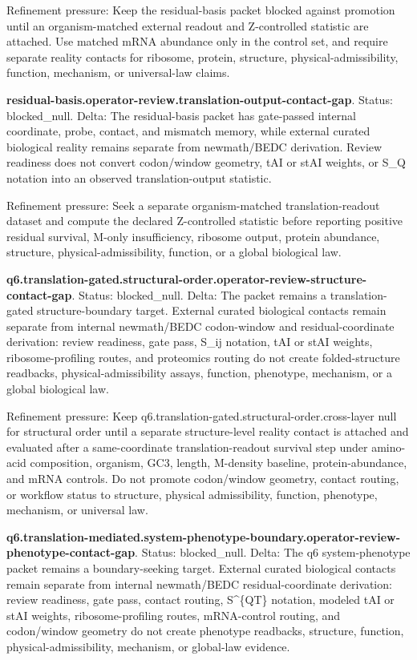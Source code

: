 Refinement pressure: Keep the residual-basis packet blocked against promotion until an organism-matched external readout and Z-controlled statistic are attached. Use matched mRNA abundance only in the control set, and require separate reality contacts for ribosome, protein, structure, physical-admissibility, function, mechanism, or universal-law claims.

\textbf{residual-basis.operator-review.translation-output-contact-gap}. Status: blocked\_null. Delta: The residual-basis packet has gate-passed internal coordinate, probe, contact, and mismatch memory, while external curated biological reality remains separate from newmath/BEDC derivation. Review readiness does not convert codon/window geometry, tAI or stAI weights, or S\_Q notation into an observed translation-output statistic.

Refinement pressure: Seek a separate organism-matched translation-readout dataset and compute the declared Z-controlled statistic before reporting positive residual survival, M-only insufficiency, ribosome output, protein abundance, structure, physical-admissibility, function, or a global biological law.

\textbf{q6.translation-gated.structural-order.operator-review-structure-contact-gap}. Status: blocked\_null. Delta: The packet remains a translation-gated structure-boundary target. External curated biological contacts remain separate from internal newmath/BEDC codon-window and residual-coordinate derivation: review readiness, gate pass, S\_ij notation, tAI or stAI weights, ribosome-profiling routes, and proteomics routing do not create folded-structure readbacks, physical-admissibility assays, function, phenotype, mechanism, or a global biological law.

Refinement pressure: Keep q6.translation-gated.structural-order.cross-layer null for structural order until a separate structure-level reality contact is attached and evaluated after a same-coordinate translation-readout survival step under amino-acid composition, organism, GC3, length, M-density baseline, protein-abundance, and mRNA controls. Do not promote codon/window geometry, contact routing, or workflow status to structure, physical admissibility, function, phenotype, mechanism, or universal law.

\textbf{q6.translation-mediated.system-phenotype-boundary.operator-review-phenotype-contact-gap}. Status: blocked\_null. Delta: The q6 system-phenotype packet remains a boundary-seeking target. External curated biological contacts remain separate from internal newmath/BEDC residual-coordinate derivation: review readiness, gate pass, contact routing, S\textasciicircum{}\{QT\} notation, modeled tAI or stAI weights, ribosome-profiling routes, mRNA-control routing, and codon/window geometry do not create phenotype readbacks, structure, function, physical-admissibility, mechanism, or global-law evidence.

